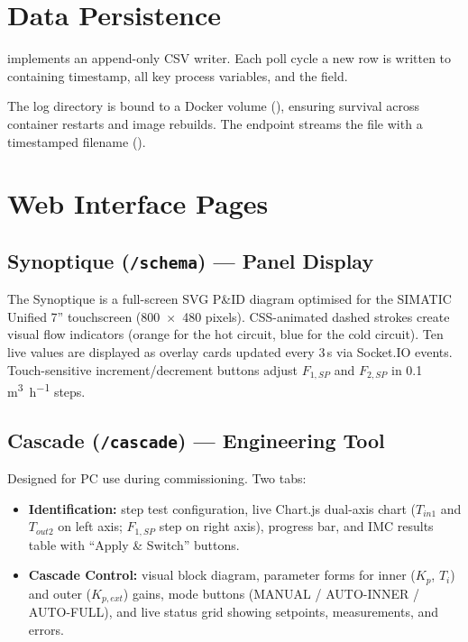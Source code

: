 \section{Data Persistence}

 implements an append-only CSV writer. Each poll cycle a new row is
written to  containing timestamp, all key process
variables, and the  field.

The log directory is bound to a Docker volume (), ensuring
survival across container restarts and image rebuilds. The endpoint
 streams the file with a timestamped filename
().

\section{Web Interface Pages}

\subsection{Synoptique (\texttt{/schema}) --- Panel Display}

The Synoptique is a full-screen SVG P\&ID diagram optimised for the
SIMATIC Unified 7\textquotedblright{} touchscreen (800~$\times$~480 pixels). CSS-animated
dashed strokes create visual flow indicators (orange for the hot circuit, blue for the
cold circuit). Ten live values are displayed as overlay cards updated every 3\,s via
 Socket.IO events. Touch-sensitive increment/decrement buttons
adjust $F_{1,SP}$ and $F_{2,SP}$ in 0.1\,\si{\metre\cubed\per\hour} steps.

\subsection{Cascade (\texttt{/cascade}) --- Engineering Tool}

Designed for PC use during commissioning. Two tabs:

\begin{itemize}[leftmargin=*, itemsep=3pt]
  \item \textbf{Identification:} step test configuration, live Chart.js dual-axis chart
    ($T_{in1}$ and $T_{out2}$ on left axis; $F_{1,SP}$ step on right axis), progress bar,
    and IMC results table with ``Apply \& Switch'' buttons.
  \item \textbf{Cascade Control:} visual block diagram, parameter forms for inner
    ($K_p$, $T_i$) and outer ($K_{p,ext}$) gains, mode buttons (MANUAL / AUTO-INNER /
    AUTO-FULL), and live status grid showing setpoints, measurements, and errors.
\end{itemize}

